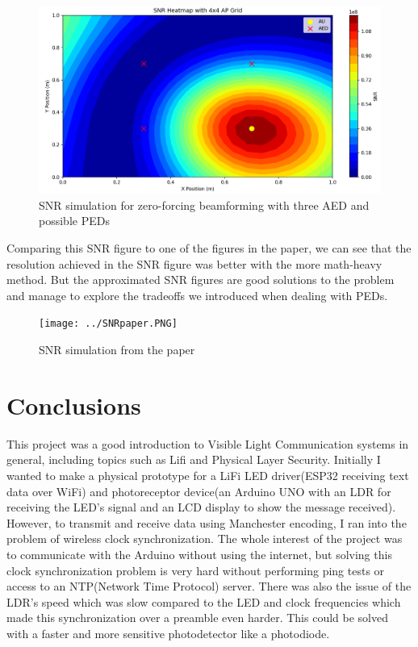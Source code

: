\documentclass[a4paper,12pt,twoside]{article}
\begin{document}
	\begin{figure}[h!]
		\centering
		\includegraphics[width=.6\textwidth]{../simu3.PNG}
		\caption{SNR simulation for zero-forcing beamforming with three AED and possible PEDs}
	\end{figure}
	
	Comparing this SNR figure to one of the figures in the paper, we can see that the resolution achieved in the SNR figure was better with the more math-heavy method. But the approximated SNR figures are good solutions to the problem and manage to explore the tradeoffs we introduced when dealing with PEDs.
	
	\begin{figure}[h!]
		\centering
		\texttt{[image: ../SNRpaper.PNG]}
		\caption{SNR simulation from the paper\cite{Oxford2021}}
	\end{figure}

	\newpage
	
	\section{Conclusions}
	
	This project was a good introduction to Visible Light Communication systems in general, including topics such as Lifi and Physical Layer Security. Initially I wanted to make a physical prototype for a LiFi LED driver(ESP32 receiving text data over WiFi) and photoreceptor device(an Arduino UNO with an LDR for receiving the LED's signal and an LCD display to show the message received). However, to transmit and receive data using Manchester encoding, I ran into the problem of wireless clock synchronization. The whole interest of the project was to communicate with the Arduino without using the internet, but solving this clock synchronization problem is very hard without performing ping tests or access to an NTP(Network Time Protocol) server. There was also the issue of the LDR's speed which was slow compared to the LED and clock frequencies which made this synchronization over a preamble even harder. This could be solved with a faster and more sensitive photodetector like a photodiode.
	
\end{document}
